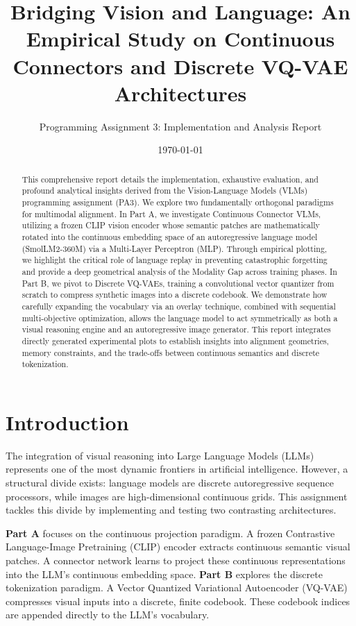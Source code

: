 \documentclass[11pt]{article}
\title{Bridging Vision and Language: An Empirical Study on Continuous Connectors and Discrete VQ-VAE Architectures}
\author{Programming Assignment 3: Implementation and Analysis Report}
\date{\today}
\begin{document}
\maketitle

\begin{abstract}
This comprehensive report details the implementation, exhaustive evaluation, and profound analytical insights derived from the Vision-Language Models (VLMs) programming assignment (PA3). We explore two fundamentally orthogonal paradigms for multimodal alignment. In Part A, we investigate Continuous Connector VLMs, utilizing a frozen CLIP vision encoder whose semantic patches are mathematically rotated into the continuous embedding space of an autoregressive language model (SmolLM2-360M) via a Multi-Layer Perceptron (MLP). Through empirical plotting, we highlight the critical role of language replay in preventing catastrophic forgetting and provide a deep geometrical analysis of the Modality Gap across training phases. In Part B, we pivot to Discrete VQ-VAEs, training a convolutional vector quantizer from scratch to compress synthetic images into a discrete codebook. We demonstrate how carefully expanding the vocabulary via an overlay technique, combined with sequential multi-objective optimization, allows the language model to act symmetrically as both a visual reasoning engine and an autoregressive image generator. This report integrates directly generated experimental plots to establish insights into alignment geometries, memory constraints, and the trade-offs between continuous semantics and discrete tokenization.
\end{abstract}

\section{Introduction}

The integration of visual reasoning into Large Language Models (LLMs) represents one of the most dynamic frontiers in artificial intelligence. However, a structural divide exists: language models are discrete autoregressive sequence processors, while images are high-dimensional continuous grids. This assignment tackles this divide by implementing and testing two contrasting architectures.

\textbf{Part A} focuses on the continuous projection paradigm. A frozen Contrastive Language-Image Pretraining (CLIP) encoder extracts continuous semantic visual patches. A connector network learns to project these continuous representations into the LLM's continuous embedding space.
\textbf{Part B} explores the discrete tokenization paradigm. A Vector Quantized Variational Autoencoder (VQ-VAE) compresses visual inputs into a discrete, finite codebook. These codebook indices are appended directly to the LLM's vocabulary.
\end{document}
